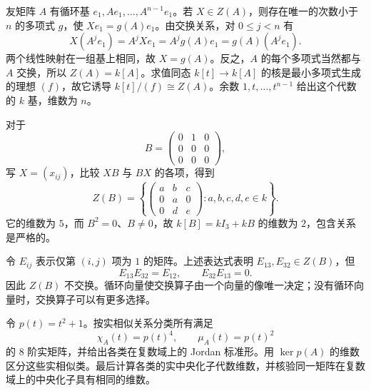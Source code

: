 \begin{solution}
	友矩阵 \(A\) 有循环基 \(e_1,Ae_1,\ldots,A^{n-1}e_1\)。若 \(X\in Z(A)\)，则存在唯一的次数小于 \(n\) 的多项式 \(g\)，使 \(Xe_1=g(A)e_1\)。由交换关系，对 \(0\le j<n\) 有
	\[
		X(A^je_1)=A^jXe_1=A^jg(A)e_1=g(A)(A^je_1).
	\]
	两个线性映射在一组基上相同，故 \(X=g(A)\)。反之，\(A\) 的每个多项式当然都与 \(A\) 交换，所以 \(Z(A)=k[A]\)。求值同态 \(k[t]\to k[A]\) 的核是最小多项式生成的理想 \((f)\)，故它诱导 \(k[t]/(f)\cong Z(A)\)。余数 \(1,t,\ldots,t^{n-1}\) 给出这个代数的 \(k\) 基，维数为 \(n\)。

	对于
	\[
		B=\begin{pmatrix}0&1&0\\0&0&0\\0&0&0\end{pmatrix},
	\]
	写 \(X=(x_{ij})\)，比较 \(XB\) 与 \(BX\) 的各项，得到
	\[
		Z(B)=\left\{
		\begin{pmatrix}a&b&c\\0&a&0\\0&d&e\end{pmatrix}
		:a,b,c,d,e\in k \right\}.
	\]
	它的维数为 \(5\)，而 \(B^2=0\)、\(B\ne0\)，故 \(k[B]=kI_3+kB\) 的维数为 \(2\)，包含关系是严格的。

	令 \(E_{ij}\) 表示仅第 \((i,j)\) 项为 \(1\) 的矩阵。上述表达式表明 \(E_{13},E_{32}\in Z(B)\)，但
	\[
		E_{13}E_{32}=E_{12},\qquad E_{32}E_{13}=0.
	\]
	因此 \(Z(B)\) 不交换。循环向量使交换算子由一个向量的像唯一决定；没有循环向量时，交换算子可以有更多选择。
\end{solution}

\begin{exercise}
	\label{b2:ex:04-real-complex-classification}
	令 \(p(t)=t^2+1\)。按实相似关系分类所有满足
	\[
		\chi_A(t)=p(t)^4,\qquad \mu_A(t)=p(t)^2
	\]
	的 \(8\) 阶实矩阵，并给出各类在复数域上的 Jordan 标准形。用 \(\ker p(A)\) 的维数区分这些实相似类。最后计算各类的实中央化子代数维数，并核验同一矩阵在复数域上的中央化子具有相同的维数。
\end{exercise}

